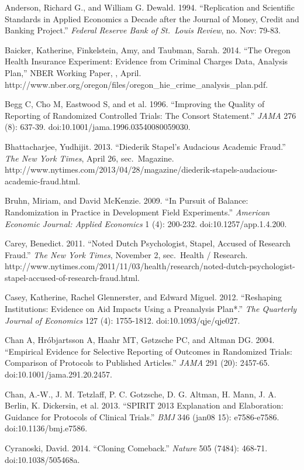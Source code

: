\documentclass[12pt] {article}
\begin{document}
Anderson, Richard G., and William G. Dewald. 1994. ``Replication and
Scientific Standards in Applied Economics a Decade after the Journal of
Money, Credit and Banking Project.'' \emph{Federal Reserve Bank of
St.~Louis Review}, no. Nov: 79-83.

Baicker, Katherine, Finkelstein, Amy, and Taubman, Sarah. 2014. ``The
Oregon Health Insurance Experiment: Evidence from Criminal Charges Data,
Analysis Plan,'' NBER Working Paper, , April.
http://www.nber.org/oregon/files/oregon\_hie\_crime\_analysis\_plan.pdf.

Begg C, Cho M, Eastwood S, and et al. 1996. ``Improving the Quality of
Reporting of Randomized Controlled Trials: The Consort Statement.''
\emph{JAMA} 276 (8): 637-39. doi:10.1001/jama.1996.03540080059030.

Bhattacharjee, Yudhijit. 2013. ``Diederik Stapel's Audacious Academic
Fraud.'' \emph{The New York Times}, April 26, sec.~Magazine.
http://www.nytimes.com/2013/04/28/magazine/diederik-stapels-audacious-academic-fraud.html.

Bruhn, Miriam, and David McKenzie. 2009. ``In Pursuit of Balance:
Randomization in Practice in Development Field Experiments.''
\emph{American Economic Journal: Applied Economics} 1 (4): 200-232.
doi:10.1257/app.1.4.200.

Carey, Benedict. 2011. ``Noted Dutch Psychologist, Stapel, Accused of
Research Fraud.'' \emph{The New York Times}, November 2, sec.~Health /
Research.
http://www.nytimes.com/2011/11/03/health/research/noted-dutch-psychologist-stapel-accused-of-research-fraud.html.

Casey, Katherine, Rachel Glennerster, and Edward Miguel. 2012.
``Reshaping Institutions: Evidence on Aid Impacts Using a Preanalysis
Plan*.'' \emph{The Quarterly Journal of Economics} 127 (4): 1755-1812.
doi:10.1093/qje/qje027.

Chan A, Hróbjartsson A, Haahr MT, Gøtzsche PC, and Altman DG. 2004.
``Empirical Evidence for Selective Reporting of Outcomes in Randomized
Trials: Comparison of Protocols to Published Articles.'' \emph{JAMA} 291
(20): 2457-65. doi:10.1001/jama.291.20.2457.

Chan, A.-W., J. M. Tetzlaff, P. C. Gotzsche, D. G. Altman, H. Mann, J.
A. Berlin, K. Dickersin, et al. 2013. ``SPIRIT 2013 Explanation and
Elaboration: Guidance for Protocols of Clinical Trials.'' \emph{BMJ} 346
(jan08 15): e7586-e7586. doi:10.1136/bmj.e7586.

Cyranoski, David. 2014. ``Cloning Comeback.'' \emph{Nature} 505 (7484):
468-71. doi:10.1038/505468a.
\end{document}
